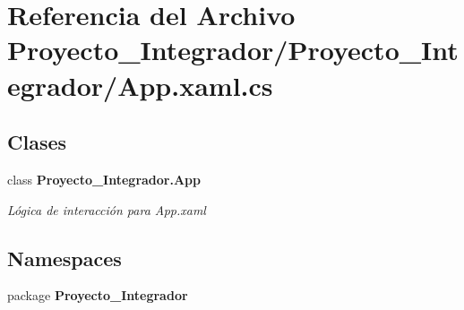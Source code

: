 \section{Referencia del Archivo Proyecto\-\_\-\-Integrador/\-Proyecto\-\_\-\-Integrador/\-App.xaml.\-cs}
\label{_app_8xaml_8cs}
\subsection*{Clases}
\begin{DoxyCompactItemize}
\item 
class {\bf Proyecto\-\_\-\-Integrador.\-App}
\begin{DoxyCompactList}\small\item\em Lógica de interacción para App.\-xaml \end{DoxyCompactList}\end{DoxyCompactItemize}
\subsection*{Namespaces}
\begin{DoxyCompactItemize}
\item 
package {\bf Proyecto\-\_\-\-Integrador}
\end{DoxyCompactItemize}
